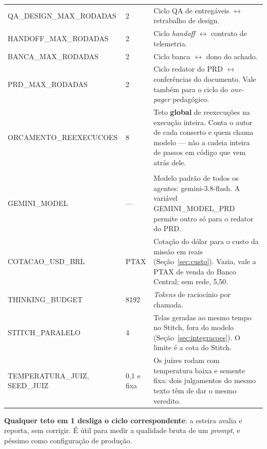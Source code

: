 \documentclass[11pt,a4paper]{article}
\newcommand{\cod}[1]{{\ttfamily\small #1}}
\begin{document}
\begin{center}
\begin{longtable}{@{}p{4.9cm}p{1.15cm}p{9.2cm}@{}}
{\ttfamily\scriptsize QA\_DESIGN\_MAX\_RODADAS} & \footnotesize 2 & \footnotesize Ciclo QA de entregáveis $\leftrightarrow$ retrabalho de design. \\
{\ttfamily\scriptsize HANDOFF\_MAX\_RODADAS} & \footnotesize 2 & \footnotesize Ciclo \emph{handoff} $\leftrightarrow$ contrato de telemetria. \\
{\ttfamily\scriptsize BANCA\_MAX\_RODADAS} & \footnotesize 2 & \footnotesize Ciclo banca $\leftrightarrow$ dono do achado. \\
{\ttfamily\scriptsize PRD\_MAX\_RODADAS} & \footnotesize 2 & \footnotesize Ciclo redator do PRD $\leftrightarrow$ conferências do documento. Vale também para o ciclo do \emph{one-pager} pedagógico. \\
{\ttfamily\scriptsize ORCAMENTO\_REEXECUCOES} & \footnotesize 8 & \footnotesize Teto \textbf{global} de reexecuções na execução inteira. Conta o autor de cada conserto e quem chama modelo --- não a cadeia inteira de passos em código que vem atrás dele. \\
\addlinespace
\multicolumn{3}{@{}l}{\sffamily\bfseries\scriptsize\color{unLavanda}MODELO} \\[2pt]
{\ttfamily\scriptsize GEMINI\_MODEL} & \footnotesize --- & \footnotesize Modelo padrão de todos os agentes: \cod{gemini-3.8-flash}. A variável \cod{GEMINI\_MODEL\_PRD} permite outro só para o redator do PRD. \\
{\ttfamily\scriptsize COTACAO\_USD\_BRL} & \footnotesize PTAX & \footnotesize Cotação do dólar para o custo da missão em reais (Seção~\ref{sec:custo}). Vazia, vale a PTAX de venda do Banco Central; sem rede, 5,50. \\
{\ttfamily\scriptsize THINKING\_BUDGET} & \footnotesize 8192 & \footnotesize \emph{Tokens} de raciocínio por chamada. \\
{\ttfamily\scriptsize STITCH\_PARALELO} & \footnotesize 4 & \footnotesize Telas geradas ao mesmo tempo no Stitch, fora do modelo (Seção~\ref{sec:integracoes}). O limite é a cota do Stitch. \\
{\ttfamily\scriptsize TEMPERATURA\_JUIZ}, {\ttfamily\scriptsize SEED\_JUIZ} & \footnotesize 0,1 e fixa & \footnotesize Os juízes rodam com temperatura baixa e semente fixa: dois julgamentos do mesmo texto têm de dar o mesmo veredito. \\
\bottomrule
\end{longtable}
\end{center}

\textbf{Qualquer teto em 1 desliga o ciclo correspondente}: a esteira avalia e reporta, sem corrigir. É útil para medir a qualidade bruta de um \emph{prompt}, e péssimo como configuração de produção.
\end{document}
